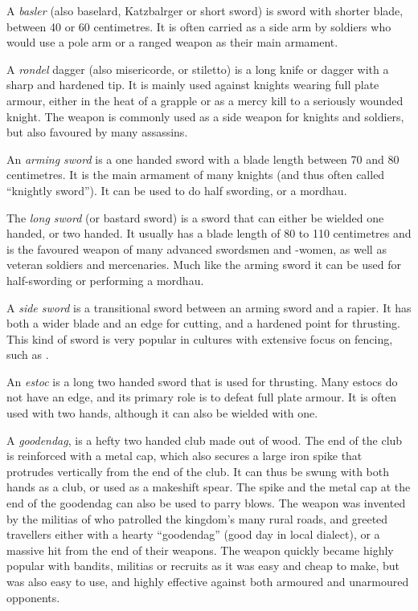 A \emph{basler} (also baselard, Katzbalrger or short sword) is sword with
shorter blade, between 40 or 60 centimetres. It is often carried as a side arm
by soldiers who would use a pole arm or a ranged weapon as their main
armament.

A \emph{rondel} dagger (also misericorde, or stiletto) is a long knife or
dagger with a sharp and hardened tip. It is mainly used against knights wearing
full plate armour, either in the heat of a grapple or as a mercy kill to a
seriously wounded knight. The weapon is commonly used as a side weapon for
knights and soldiers, but also favoured by many assassins.

An \emph{arming sword} is a one handed sword with a blade length between 70
and 80 centimetres. It is the main armament of many knights (and thus often
called ``knightly sword''). It can be used to do half swording, or a mordhau.

The \emph{long sword} (or bastard sword) is a sword that can either be wielded
one handed, or two handed. It usually has a blade length of 80 to 110
centimetres and is the favoured weapon of many advanced swordsmen and -women,
as well as veteran soldiers and mercenaries. Much like the arming sword it
can be used for half-swording or performing a mordhau.

A \emph{side sword} is a transitional sword between an arming sword and a
rapier. It has both a wider blade and an edge for cutting, and a hardened
point for thrusting. This kind of sword is very popular in cultures with
extensive focus on fencing, such as .

An \emph{estoc} is a long two handed sword that is used for thrusting. Many
estocs do not have an edge, and its primary role is to defeat full plate
armour. It is often used with two hands, although it can also be wielded with
one.

A \emph{goodendag}, is a hefty two handed club made out of wood. The end of
the club is reinforced with a metal cap, which also secures a large iron spike
that protrudes vertically from the end of the club. It can thus be swung with
both hands as a club, or used as a makeshift spear. The spike and the metal
cap at the end of the goodendag can also be used to parry blows. The weapon
was invented by the militias of  who patrolled the
kingdom's many rural roads, and greeted travellers either with a hearty
``goodendag'' (good day in local dialect), or a massive hit from the end of
their weapons. The weapon quickly became highly popular with bandits, militias
or recruits as it was easy and cheap to make, but was also easy to use, and
highly effective against both armoured and unarmoured opponents.

